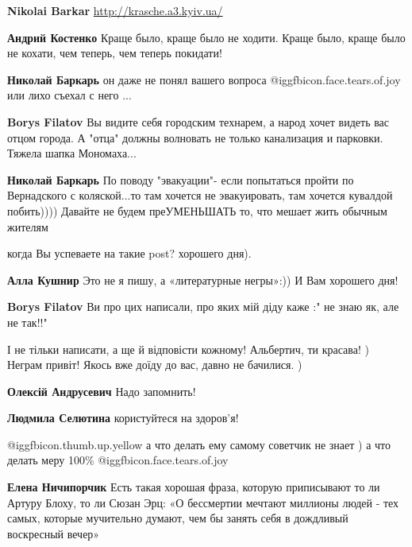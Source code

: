 \begin{itemize}
\begin{itemize}
\textbf{Nikolai Barkar} \url{http://krasche.a3.kyiv.ua/}

\textbf{Андрий Костенко} Краще было, краще было не ходити. Краще было, краще было не кохати, чем теперь, чем теперь покидати!

\textbf{Николай Баркарь} он даже не понял вашего вопроса  @igg{fbicon.face.tears.of.joy} или лихо съехал с него ...

\textbf{Borys Filatov} Вы видите себя городским технарем, а народ хочет видеть вас отцом города. А "отца" должны волновать не только канализация и парковки. Тяжела шапка Мономаха...

\textbf{Николай Баркарь} По поводу "эвакуации"- если попытаться пройти по Вернадского с коляской...то там хочется не эвакуировать, там хочется кувалдой побить)))) Давайте не будем преУМЕНЬШАТЬ то, что мешает жить обычным жителям

\end{itemize} %

когда Вы успеваете на такие post? хорошего дня).

\begin{itemize} %
\textbf{Алла Кушнир} Это не я пишу, а «литературные негры»:))
И Вам хорошего дня!

\textbf{Borys Filatov} Ви про цих написали, про яких мій діду каже :" не знаю як, але не так!!"

І не тільки написати, а ще й відповісти кожному! Альбертич, ти красава! )
Неграм привіт!
Якось вже доїду до вас, давно не бачилися. )

\textbf{Олексій Андрусевич} Надо запомнить!

\textbf{Людмила Селютина} користуйтеся на здоров'я!
\end{itemize} %

 @igg{fbicon.thumb.up.yellow} а что делать ему самому советчик не знает ) а что делать меру 100\% @igg{fbicon.face.tears.of.joy} 

\begin{itemize} %
\textbf{Елена Ничипорчик} Есть такая хорошая фраза, которую приписывают то ли Артуру Блоху, то ли Сюзан Эрц: «О бессмертии мечтают миллионы людей - тех самых, которые мучительно думают, чем бы занять себя в дождливый воскресный вечер»


\end{itemize}
\end{itemize}
